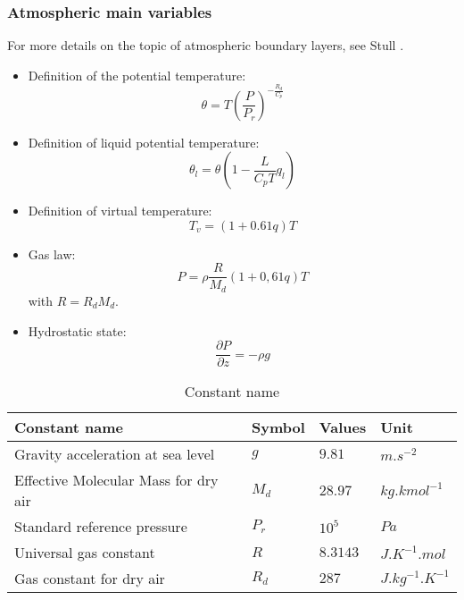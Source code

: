 {{\subsubsection{Atmospheric main variables}

For more details on the topic of atmospheric boundary layers, see  Stull
\cite{stull}.
%
\begin{itemize}
\item Definition of the potential temperature:
\[
\theta =T\left(\frac{P}{P_{r}}\right)^{-\frac{R_{d}}{C_{p}}}
\]
\item Definition of liquid potential temperature:
\[
\theta_{l} = \theta \left( 1-\frac{L}{C_{p}T} q_{l} \right)
\]
\item Definition of virtual temperature:
\[
T_{v} = \left(1+0.61q\right)T
\]
\item Gas law:
\[
P = \rho \frac{R}{M_{d}}\left(1+0,61q\right)T
\]
with $R=R_{d} M_{d}$.
\item Hydrostatic state:
\[
\frac{\partial P}{\partial z} = -\rho g
\]
\end{itemize}
%
\begin{table}[htbp]
\begin{center}
\begin{tabular}{|l|l|l|l|}
\hline
\textbf{Constant name} & \textbf{Symbol} & \textbf{Values} & \textbf{Unit} \\
\hline
Gravity acceleration at sea level & $g$ & $9.81$ & $m.s^{-2}$ \\
\hline
Effective Molecular Mass for dry air & $M_{d}$ & $28.97$ & $kg.kmol^{-1}$ \\
\hline
Standard reference pressure & $P_{r}$ & $10^{5}$ & $Pa$ \\
\hline
Universal gas constant & $R$ & $8.3143$ & $J.K^{-1}.mol$ \\
\hline
Gas constant for dry air & $R_{d}$ & $287$ & $J.kg^{-1}.K^{-1}$ \\
\hline
\end{tabular}\label{tab2}
\end{center}
\caption{Constant name}
\end{table}

}}
